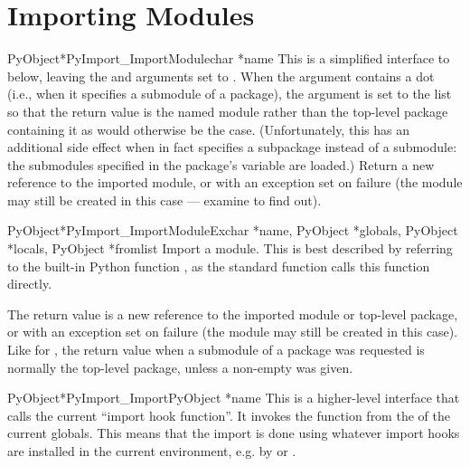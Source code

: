 \documentclass{manual}
\begin{document}
\section{Importing Modules \label{importing}}

\begin{cfuncdesc}{PyObject*}{PyImport_ImportModule}{char *name}
This is a simplified interface to
 below, leaving the
 and  arguments set to \NULL{}.  When the
 argument contains a dot (i.e., when it specifies a
submodule of a package), the  argument is set to the
list \code{['*']} so that the return value is the named module rather
than the top-level package containing it as would otherwise be the
case.  (Unfortunately, this has an additional side effect when
 in fact specifies a subpackage instead of a submodule: the
submodules specified in the package's  variable are
loaded.)  Return a
new reference to the imported module, or
\NULL{} with an exception set on failure (the module may still be
created in this case --- examine  to find out).
\end{cfuncdesc}

\begin{cfuncdesc}{PyObject*}{PyImport_ImportModuleEx}{char *name, PyObject *globals, PyObject *locals, PyObject *fromlist}
Import a module.  This is best described by referring to the built-in
Python function , as
the standard  function calls this function
directly.

The return value is a new reference to the imported module or
top-level package, or \NULL{} with an exception set on failure
(the module may still be created in this case).  Like for
, the return value when a submodule of a
package was requested is normally the top-level package, unless a
non-empty  was given.
\end{cfuncdesc}

\begin{cfuncdesc}{PyObject*}{PyImport_Import}{PyObject *name}
This is a higher-level interface that calls the current ``import hook
function''.  It invokes the  function from the
 of the current globals.  This means that the
import is done using whatever import hooks are installed in the
current environment, e.g. by  or
.
\end{cfuncdesc}
\end{document}
